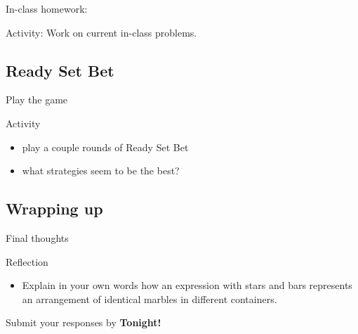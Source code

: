 \documentclass{beamer}
\begin{document}
\begin{frame}{In-class homework:}
  \begin{block}{Activity:}
    Work on current in-class problems.
  \end{block}
\end{frame}

\subsection{Ready Set Bet}

\begin{frame}{Play the game}
  \begin{block}{Activity}
    \begin{itemize}
\pause
      \item play a couple rounds of Ready Set Bet
\pause
      \item what strategies seem to be the best?
    \end{itemize}
  \end{block}
\end{frame}

\subsection{Wrapping up}

\begin{frame}{Final thoughts}
  \begin{block}{Reflection}
    \begin{itemize}
\pause
      \item Explain in your own words how an expression with stars and bars represents an arrangement of identical marbles in different containers.
    \end{itemize}
  \end{block}
\begin{center}
Submit your responses by \textbf{Tonight!}
\end{center}
\end{frame}
\end{document}
